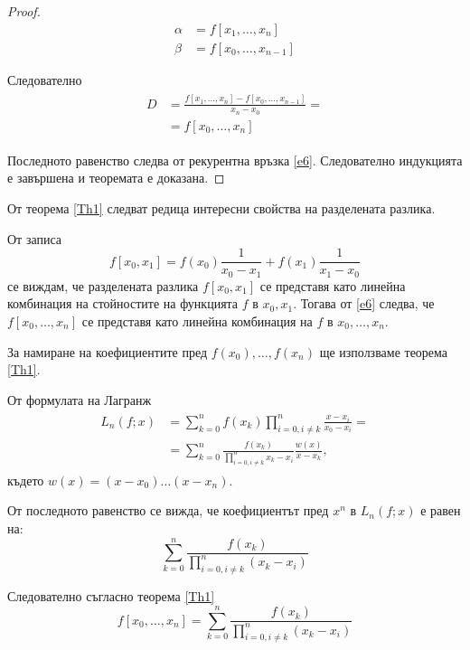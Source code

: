 \documentclass[12pt]{article}
\numberwithin{equation}{section}
\numberwithin{theorem}{section}
\numberwithin{definition}{section}
\numberwithin{corollary}{section}
\begin{document}
\begin{proof}
\begin{align*}
\alpha &= f[x_1, \dotso, x_n]\\
\beta &= f[x_0, \dotso, x_{n-1}]
\end{align*}
\par
Следователно
\begin{align*}
\begin{split}
D &= \frac{f[x_1, \dotso, x_n] - f[x_0, \dotso, x_{n-1}]}{x_n - x_0} =\\
&= f[x_0, \dotso, x_n]
\end{split}
\end{align*}
\par
Последното равенство следва от рекурентна връзка \ref{e6}. Следователно индукцията е завършена и теоремата е доказана.
\end{proof}
\par
От теорема \ref{Th1} следват редица интересни свойства на разделената разлика.
\par
От записа
\[
f[x_0, x_1] = f(x_0)\frac{1}{x_0 - x_1} + f(x_1)\frac{1}{x_1-x_0}
\]
се виждам, че разделената разлика $f[x_0,x_1]$ се представя като линейна комбинация на стойностите на функцията $f$ в $x_0, x_1$. Тогава от \ref{e6} следва, че $f[x_0, \dotso, x_n]$ се представя като линейна комбинация на $f$ в $x_0, \dotso, x_n$.
\par
За намиране на коефициентите пред $f(x_0), \dotso, f(x_n)$ ще използваме теорема \ref{Th1}.
\par
От формулата на Лагранж
\begin{align*}
\begin{split}
L_n(f;x) &= \displaystyle\sum_{k=0}^nf(x_k)
            \displaystyle\prod_{i=0,i \neq k}^n\frac{x-x_i}{x_0 - x_i} =\\
        &=  \displaystyle\sum_{k=0}^n
            \frac{f(x_k)}{\displaystyle\prod_{i=0, i \neq k}^nx_k - x_i}
            \frac{w(x)}{x-x_k},
\end{split}
\end{align*}
където $w(x) = (x - x_0)\dotso (x - x_n)$.
\par
От последното равенство се вижда, че коефициентът пред $x^n$ в $L_n(f;x)$ е равен на:
\[
\displaystyle\sum_{k=0}^n\frac{f(x_k)}{\displaystyle\prod_{i=0,i\neq k}^n(x_k-x_i)}
\]
\par
Следователно съгласно теорема \ref{Th1}
\begin{equation} \label{e2.2}
f[x_0, \dotso, x_n] = \displaystyle\sum_{k=0}^n\frac{f(x_k)}{\displaystyle\prod_{i=0,i\neq k}^n(x_k-x_i)}
\end{equation}
\par
\end{document}
